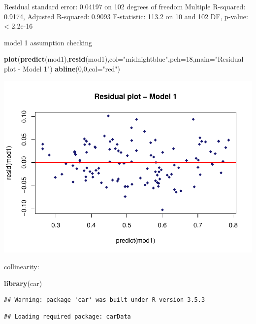 \documentclass[
]{article}
\newenvironment{Shaded}{\begin{snugshade}}{\end{snugshade}}
\newcommand{\DataTypeTok}[1]{\textcolor[rgb]{0.13,0.29,0.53}{#1}}
\newcommand{\DecValTok}[1]{\textcolor[rgb]{0.00,0.00,0.81}{#1}}
\newcommand{\KeywordTok}[1]{\textcolor[rgb]{0.13,0.29,0.53}{\textbf{#1}}}
\newcommand{\NormalTok}[1]{#1}
\newcommand{\StringTok}[1]{\textcolor[rgb]{0.31,0.60,0.02}{#1}}
\begin{document}
Residual standard error: 0.04197 on 102 degrees of freedom Multiple
R-squared: 0.9174, Adjusted R-squared: 0.9093 F-statistic: 113.2 on 10
and 102 DF, p-value: \textless{} 2.2e-16

model 1 assumption checking

\begin{Shaded}
\begin{Highlighting}[]
\KeywordTok{plot}\NormalTok{(}\KeywordTok{predict}\NormalTok{(mod1),}\KeywordTok{resid}\NormalTok{(mod1),}\DataTypeTok{col=}\StringTok{"midnightblue"}\NormalTok{,}\DataTypeTok{pch=}\DecValTok{18}\NormalTok{,}\DataTypeTok{main=}\StringTok{"Residual plot - Model 1"}\NormalTok{)}
\KeywordTok{abline}\NormalTok{(}\DecValTok{0}\NormalTok{,}\DecValTok{0}\NormalTok{,}\DataTypeTok{col=}\StringTok{"red"}\NormalTok{)}
\end{Highlighting}
\end{Shaded}

\includegraphics{Zhong_paper_files/figure-latex/unnamed-chunk-3-1.pdf}

collinearity:

\begin{Shaded}
\begin{Highlighting}[]
\KeywordTok{library}\NormalTok{(car)}
\end{Highlighting}
\end{Shaded}

\begin{verbatim}
## Warning: package 'car' was built under R version 3.5.3
\end{verbatim}

\begin{verbatim}
## Loading required package: carData
\end{verbatim}
\end{document}
